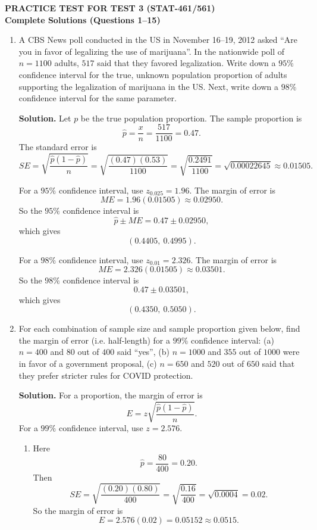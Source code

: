 \documentclass[12pt]{article}
\begin{document}
\begin{center}
    {\Large \textbf{PRACTICE TEST FOR TEST 3 (STAT-461/561)}}\\[4pt]
    {\large \textbf{Complete Solutions (Questions 1--15)}}
\end{center}

\begin{enumerate}[label=(\arabic*), leftmargin=*]

\item A CBS News poll conducted in the US in November 16--19, 2012 asked ``Are you in favor of legalizing the use of marijuana''. In the nationwide poll of $n=1100$ adults, $517$ said that they favored legalization. Write down a $95\%$ confidence interval for the true, unknown population proportion of adults supporting the legalization of marijuana in the US. Next, write down a $98\%$ confidence interval for the same parameter.

\par\medskip
\noindent\textbf{Solution.}
Let $p$ be the true population proportion. The sample proportion is
\[
\hat p=\frac{x}{n}=\frac{517}{1100}=0.47.
\]
The standard error is
\[
SE=\sqrt{\frac{\hat p(1-\hat p)}{n}}
=\sqrt{\frac{(0.47)(0.53)}{1100}}
=\sqrt{\frac{0.2491}{1100}}
=\sqrt{0.00022645}
\approx 0.01505.
\]

For a $95\%$ confidence interval, use $z_{0.025}=1.96$. The margin of error is
\[
ME=1.96(0.01505)\approx 0.02950.
\]
So the $95\%$ confidence interval is
\[
\hat p\pm ME=0.47\pm 0.02950,
\]
which gives
\[
(0.4405,\ 0.4995).
\]

For a $98\%$ confidence interval, use $z_{0.01}=2.326$. The margin of error is
\[
ME=2.326(0.01505)\approx 0.03501.
\]
So the $98\%$ confidence interval is
\[
0.47\pm 0.03501,
\]
which gives
\[
(0.4350,\ 0.5050).
\]

\item For each combination of sample size and sample proportion given below, find the margin of error (i.e. half-length) for a $99\%$ confidence interval: (a) $n=400$ and $80$ out of $400$ said ``yes'', (b) $n=1000$ and $355$ out of $1000$ were in favor of a government proposal, (c) $n=650$ and $520$ out of $650$ said that they prefer stricter rules for COVID protection.

\par\medskip
\noindent\textbf{Solution.}
For a proportion, the margin of error is
\[
E=z\sqrt{\frac{\hat p(1-\hat p)}{n}}.
\]
For a $99\%$ confidence interval, use $z=2.576$.

\begin{enumerate}[label=(\alph*)]
    \item Here
    \[
    \hat p=\frac{80}{400}=0.20.
    \]
    Then
    \[
    SE=\sqrt{\frac{(0.20)(0.80)}{400}}=\sqrt{\frac{0.16}{400}}=\sqrt{0.0004}=0.02.
    \]
    So the margin of error is
    \[
    E=2.576(0.02)=0.05152\approx 0.0515.
    \]


\end{enumerate}
\end{enumerate}
\end{document}
